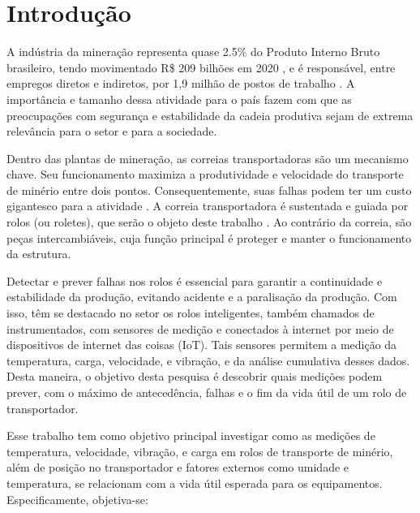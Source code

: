 
\chapter[Introdução]{Introdução}
A indústria da mineração representa quase 2.5\% do Produto Interno Bruto brasileiro, tendo movimentado R\$ 209 bilhões em 2020 \cite{governo2021}, e é responsável, entre empregos diretos e indiretos, por 1,9 milhão de postos de trabalho \cite{instituto2020}. A importância e tamanho dessa atividade para o país fazem com que as preocupações com segurança e estabilidade da cadeia produtiva sejam de extrema relevância para o setor e para a sociedade.\par
Dentro das plantas de mineração, as correias transportadoras são um mecanismo chave. Seu funcionamento maximiza a produtividade e velocidade do transporte de minério entre dois pontos. Consequentemente, suas falhas podem ter um custo gigantesco para a atividade \cite{schmersal2020}. A correia transportadora é sustentada e guiada por rolos (ou roletes), que serão o objeto deste trabalho \cite{maranhao2009}. Ao contrário da correia, são peças intercambiáveis, cuja função principal é proteger e manter o funcionamento da estrutura.\par

Detectar e prever falhas nos rolos é essencial para garantir a continuidade e estabilidade da produção, evitando acidente e a paralisação da produção. Com isso, têm se destacado no setor os rolos inteligentes, também chamados de instrumentados, com sensores de medição e conectados à internet por meio de dispositivos de internet das coisas (IoT). Tais sensores permitem a medição da temperatura, carga, velocidade, e vibração, e da análise cumulativa desses dados. Desta maneira, o objetivo desta pesquisa é descobrir quais medições podem prever, com o máximo de antecedência, falhas e o fim da vida útil de um rolo de transportador.\par

Esse trabalho tem como objetivo principal investigar como as medições de temperatura, velocidade, vibração, e carga em rolos de transporte de minério, além de posição no transportador e fatores externos como umidade e temperatura, se relacionam com a vida útil esperada para os equipamentos. Especificamente, objetiva-se:\par

